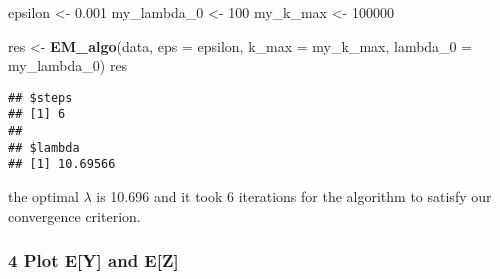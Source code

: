 \documentclass[
]{article}
\newenvironment{Shaded}{\begin{snugshade}}{\end{snugshade}}
\newcommand{\DataTypeTok}[1]{\textcolor[rgb]{0.13,0.29,0.53}{#1}}
\newcommand{\DecValTok}[1]{\textcolor[rgb]{0.00,0.00,0.81}{#1}}
\newcommand{\FloatTok}[1]{\textcolor[rgb]{0.00,0.00,0.81}{#1}}
\newcommand{\KeywordTok}[1]{\textcolor[rgb]{0.13,0.29,0.53}{\textbf{#1}}}
\newcommand{\NormalTok}[1]{#1}
\newcommand{\StringTok}[1]{\textcolor[rgb]{0.31,0.60,0.02}{#1}}
\begin{document}
\begin{Shaded}
\begin{Highlighting}[]
\NormalTok{epsilon <-}\StringTok{ }\FloatTok{0.001}
\NormalTok{my_lambda_}\DecValTok{0}\NormalTok{ <-}\StringTok{ }\DecValTok{100}
\NormalTok{my_k_max <-}\StringTok{ }\DecValTok{100000}

\NormalTok{res <-}\StringTok{ }\KeywordTok{EM_algo}\NormalTok{(data, }\DataTypeTok{eps =}\NormalTok{ epsilon, }\DataTypeTok{k_max =}\NormalTok{ my_k_max, }\DataTypeTok{lambda_0 =}\NormalTok{ my_lambda_}\DecValTok{0}\NormalTok{)}
\NormalTok{res}
\end{Highlighting}
\end{Shaded}

\begin{verbatim}
## $steps
## [1] 6
## 
## $lambda
## [1] 10.69566
\end{verbatim}

the optimal \(\lambda\) is 10.696 and it took 6 iterations for the
algorithm to satisfy our convergence criterion.

\hypertarget{plot-ey-and-ez}{%
\subsubsection{4 Plot E{[}Y{]} and E{[}Z{]}}\label{plot-ey-and-ez}}
\end{document}

